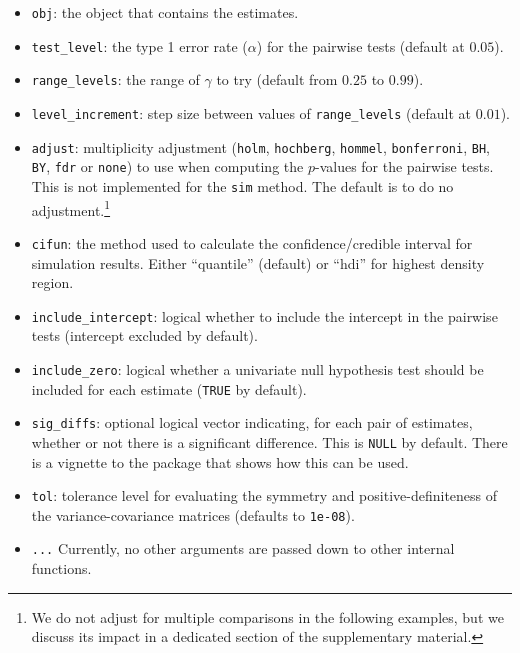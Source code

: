 \begin{itemize}
\tightlist
\item
  \texttt{obj}: the object that contains the estimates.
\item
  \texttt{test\_level}: the type 1 error rate (\(\alpha\)) for the pairwise tests (default at \(0.05\)).
\item
  \texttt{range\_levels}: the range of \(\gamma\) to try (default from \(0.25\) to \(0.99\)).
\item
  \texttt{level\_increment}: step size between values of \texttt{range\_levels} (default at \(0.01\)).
\item
  \texttt{adjust}: multiplicity adjustment (\texttt{holm}, \texttt{hochberg}, \texttt{hommel}, \texttt{bonferroni}, \texttt{BH}, \texttt{BY}, \texttt{fdr} or \texttt{none}) to use when computing the \(p\)-values for the pairwise tests. This is not implemented for the \texttt{sim} method. The default is to do no adjustment.\footnote{We do not adjust for multiple comparisons in the following examples, but we discuss its impact in a dedicated section of the supplementary material.}\\
\item
  \texttt{cifun}: the method used to calculate the confidence/credible interval for simulation results. Either ``quantile'' (default) or ``hdi'' for highest density region.
\item
  \texttt{include\_intercept}: logical whether to include the intercept in the pairwise tests (intercept excluded by default).
\item
  \texttt{include\_zero}: logical whether a univariate null hypothesis test should be included for each estimate (\texttt{TRUE} by default).
\item
  \texttt{sig\_diffs}: optional logical vector indicating, for each pair of estimates, whether or not there is a significant difference. This is \texttt{NULL} by default. There is a vignette to the package that shows how this can be used.
\item
  \texttt{tol}: tolerance level for evaluating the symmetry and positive-definiteness of the variance-covariance matrices (defaults to \texttt{1e-08}).
\item
  \texttt{...} Currently, no other arguments are passed down to other internal functions.
\end{itemize}

